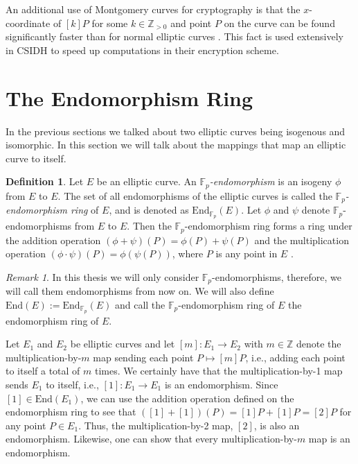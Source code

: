 \documentclass[openany, a4paper, 10pt]{book}
\theoremstyle{plain}
\theoremstyle{plain}
\theoremstyle{plain}
\theoremstyle{definition}
\newtheorem{definition}[theorem]{Definition}
\theoremstyle{plain}
\theoremstyle{definition}
\theoremstyle{remark}
\newtheorem*{remark}{Remark}
\begin{document}
An additional use of Montgomery curves for cryptography is that the $x$-coordinate of $[k]P$ for some $k \in \mathbb Z_{>0}$ and point $P$ on the curve can be found significantly faster than for normal elliptic curves \cite[p.~26]{CSIDH}.
This fact is used extensively in CSIDH to speed up computations in their encryption scheme.


\section{The Endomorphism Ring}\label{sec:endomorphism_ring}
In the previous sections we talked about two elliptic curves being isogenous and isomorphic.
In this section we will talk about the mappings that map an elliptic curve to itself.
\begin{definition}
    Let $E$ be an elliptic curve.
    An \textit{$\mathbb F_p$-endomorphism} is an isogeny $\phi$ from $E$ to $E$.
    The set of all endomorphisms of the elliptic curves is called the \textit{$\mathbb F_p$-endomorphism ring} of $E$, and is denoted as $\mathrm{End}_{\mathbb F_p}(E)$.
    Let $\phi$ and $\psi$ denote $\mathbb F_p$-endomorphisms from $E$ to $E$.
    Then the $\mathbb F_p$-endomorphism ring forms a ring under the addition operation $(\phi + \psi)(P) = \phi(P) + \psi(P)$ and the multiplication operation $(\phi\cdot \psi)(P) = \phi(\psi(P))$, where $P$ is any point in $E$ \cite[Proposition~4.2(c)]{arithmetic}.
\end{definition}
\begin{remark}
    In this thesis we will only consider $\mathbb F_p$-endomorphisms, therefore, we will call them endomorphisms from now on.
    We will also define $\mathrm{End}(E) := \mathrm{End}_{\mathbb F_p}(E)$ and call the $\mathbb F_p$-endomorphism ring of $E$ the endomorphism ring of $E$.
\end{remark}

Let $E_1$ and $E_2$ be elliptic curves and let $[m]: E_1 \to E_2$ with $m \in \mathbb Z$ denote the multiplication-by-$m$ map sending each point $P \mapsto [m]P$, i.e., adding each point to itself a total of $m$ times.
We certainly have that the multiplication-by-1 map sends $E_1$ to itself, i.e., $[1]: E_1 \to E_1$ is an endomorphism.
Since $[1] \in \mathrm{End}(E_1)$, we can use the addition operation defined on the endomorphism ring to see that $([1]+[1])(P)=[1]P + [1]P = [2]P$ for any point $P \in E_1$.
Thus, the multiplication-by-2 map, $[2]$, is also an endomorphism.
Likewise, one can show that every multiplication-by-$m$ map is an endomorphism.
\end{document}
